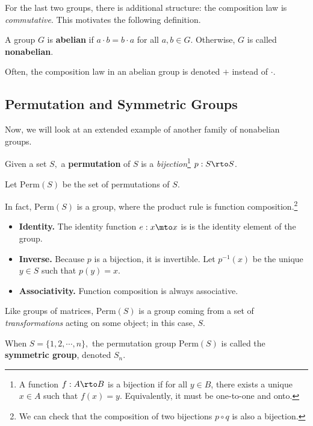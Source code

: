 For the last two groups, there is additional structure: the composition law is \emph{commutative}. This motivates the following definition.
\begin{definition}
A group $G$ is \textbf{abelian} if $a \cdot b = b \cdot a$ for all $a, b \in G.$ Otherwise, $G$ is called \textbf{nonabelian}.
\end{definition}

Often, the composition law in an abelian group is denoted $+$ instead of $\cdot.$


\subsection{Permutation and Symmetric Groups}
Now, we will look at an extended example of another family of nonabelian groups.

\begin{definition}
Given a set $S,$ a \textbf{permutation} of $S$ is a \emph{bijection}\footnote{A function $f: A \rto B$ is a bijection if for all $y \in B$, there exists a unique $x \in A$ such that $f(x) = y$. Equivalently, it must be one-to-one and onto.} $p: S \rto S$.
\end{definition}

\begin{definition}
Let $\text{Perm}(S)$ be the set of permutations of $S$. 
\end{definition}

In fact, $\text{Perm}(S)$ is a group, where the product rule is function composition.\footnote{We can check that the composition of two bijections $p \circ q$ is also a bijection.}
\begin{itemize}
    \item \textbf{Identity.} The identity function $e: x \mto x$ is is the identity element of the group.
    
    \item \textbf{Inverse.} Because $p$ is a bijection, it is invertible. Let $p^{-1}(x)$ be the unique $y \in S$ such that $p(y) = x.$
    
    \item \textbf{Associativity.} Function composition is always associative.
\end{itemize}

Like groups of matrices, $\text{Perm}(S)$ is a group coming from a set of \emph{transformations} acting on some object; in this case, $S$. 

\begin{definition}
When $S = \{1, 2, \cdots, n\},$ the permutation group $\text{Perm}(S)$ is called the \textbf{symmetric group}, denoted $S_n.$
\end{definition}

